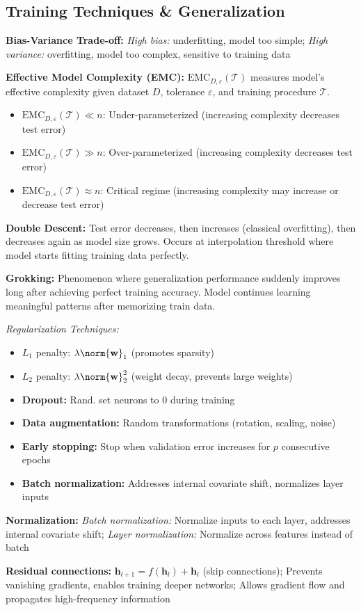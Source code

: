 \subsection{Training Techniques \& Generalization}

\textbf{Bias-Variance Trade-off:} \textit{High bias:} underfitting, model too simple; \textit{High variance:} overfitting, model too complex, sensitive to training data

\textbf{Effective Model Complexity (EMC):} $\text{EMC}_{D,\varepsilon}(\mathcal{T})$ measures model's effective complexity given dataset $D$, tolerance $\varepsilon$, and training procedure $\mathcal{T}$.

\begin{itemize}
    \item $\text{EMC}_{D,\varepsilon}(\mathcal{T}) \ll n$: Under-parameterized (increasing complexity decreases test error)
    \item $\text{EMC}_{D,\varepsilon}(\mathcal{T}) \gg n$: Over-parameterized (increasing complexity decreases test error)
    \item $\text{EMC}_{D,\varepsilon}(\mathcal{T}) \approx n$: Critical regime (increasing complexity may increase or decrease test error)
\end{itemize}

\textbf{Double Descent:} Test error decreases, then increases (classical overfitting), then decreases again as model size grows. Occurs at interpolation threshold where model starts fitting training data perfectly.

\textbf{Grokking:} Phenomenon where generalization performance suddenly improves long after achieving perfect training accuracy. Model continues learning meaningful patterns after memorizing train data.



\emph{Regularization Techniques:}
\begin{itemize}
    \item $L_1$ penalty: $\lambda \norm{\mathbf{w}}_1$ (promotes sparsity)
    \item $L_2$ penalty: $\lambda \norm{\mathbf{w}}_2^2$ (weight decay, prevents large weights)
    \item \textbf{Dropout:} Rand. set neurons to $0$ during training
    \item \textbf{Data augmentation:} Random transformations (rotation, scaling, noise)
    \item \textbf{Early stopping:} Stop when validation error increases for $p$ consecutive epochs
    \item \textbf{Batch normalization:} Addresses internal covariate shift, normalizes layer inputs
\end{itemize}

\textbf{Normalization:} \textit{Batch normalization:} Normalize inputs to each layer, addresses internal covariate shift; \textit{Layer normalization:} Normalize across features instead of batch

\textbf{Residual connections:} $\mathbf{h}_{l+1} = f(\mathbf{h}_l) + \mathbf{h}_l$ (skip connections); Prevents vanishing gradients, enables training deeper networks; Allows gradient flow and propagates high-frequency information


